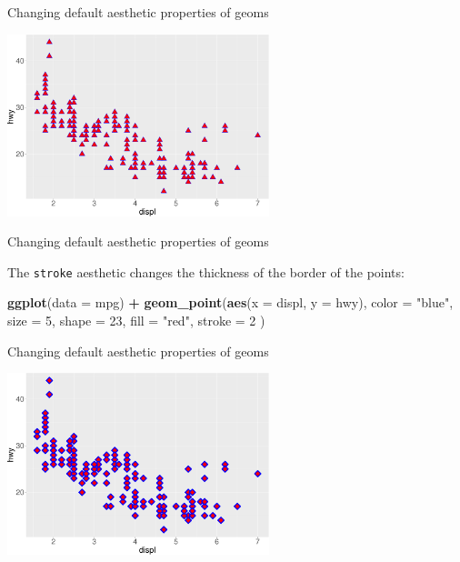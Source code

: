 \documentclass[ignorenonframetext,]{beamer}
\newenvironment{Shaded}{\begin{snugshade}}{\end{snugshade}}
\newcommand{\DataTypeTok}[1]{\textcolor[rgb]{0.13,0.29,0.53}{#1}}
\newcommand{\DecValTok}[1]{\textcolor[rgb]{0.00,0.00,0.81}{#1}}
\newcommand{\KeywordTok}[1]{\textcolor[rgb]{0.13,0.29,0.53}{\textbf{#1}}}
\newcommand{\NormalTok}[1]{#1}
\newcommand{\OperatorTok}[1]{\textcolor[rgb]{0.81,0.36,0.00}{\textbf{#1}}}
\newcommand{\StringTok}[1]{\textcolor[rgb]{0.31,0.60,0.02}{#1}}
\begin{document}
\begin{frame}{Changing default aesthetic properties of geoms}
\protect\hypertarget{changing-default-aesthetic-properties-of-geoms-9}{}

\begin{center}\includegraphics[height=200px]{data-visualization_files/figure-beamer/unnamed-chunk-45-1} \end{center}

\end{frame}

\begin{frame}[fragile]{Changing default aesthetic properties of geoms}
\protect\hypertarget{changing-default-aesthetic-properties-of-geoms-10}{}

The \texttt{stroke} aesthetic changes the thickness of the border of the
points:

\begin{Shaded}
\begin{Highlighting}[]
\KeywordTok{ggplot}\NormalTok{(}\DataTypeTok{data =}\NormalTok{ mpg) }\OperatorTok{+}
\StringTok{  }\KeywordTok{geom_point}\NormalTok{(}\KeywordTok{aes}\NormalTok{(}\DataTypeTok{x =}\NormalTok{ displ, }\DataTypeTok{y =}\NormalTok{ hwy),}
    \DataTypeTok{color =} \StringTok{"blue"}\NormalTok{,}
    \DataTypeTok{size =} \DecValTok{5}\NormalTok{,}
    \DataTypeTok{shape =} \DecValTok{23}\NormalTok{,}
    \DataTypeTok{fill =} \StringTok{"red"}\NormalTok{,}
    \DataTypeTok{stroke =} \DecValTok{2}
\NormalTok{  )}
\end{Highlighting}
\end{Shaded}

\end{frame}

\begin{frame}{Changing default aesthetic properties of geoms}
\protect\hypertarget{changing-default-aesthetic-properties-of-geoms-11}{}

\begin{center}\includegraphics[height=200px]{data-visualization_files/figure-beamer/unnamed-chunk-47-1} \end{center}

\end{frame}
\end{document}
